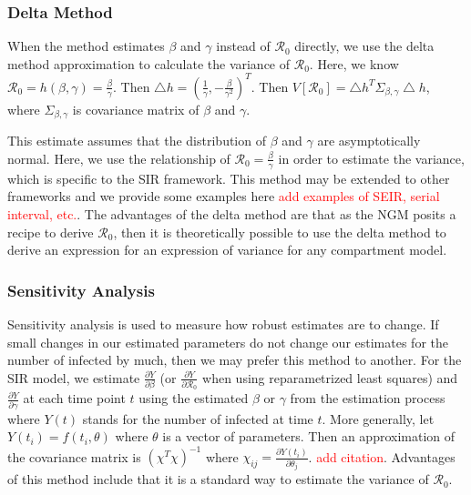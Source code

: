 \documentclass[12pt]{article}
\newcommand{\com}[1]{\textcolor{red}{ #1}}
\newcommand{\rr}{\ensuremath{\mathcal{R}_0}}
\begin{document}
\subsubsection{Delta Method}\label{delta-method}

When the method estimates \(\beta\) and \(\gamma\) instead of \(\rr\) directly, we use the delta method approximation to calculate the
variance of \(\rr\). Here, we know \(\rr = h(\beta, \gamma) = \frac{\beta}{\gamma}\). Then \(\bigtriangleup h = (\frac{1}{\gamma},  -\frac{\beta}{\gamma^2})^T\).  Then \(V[\rr] = \bigtriangleup h^T \Sigma_{\beta, \gamma} \bigtriangleup h\), where \(\Sigma_{\beta, \gamma}\) is covariance matrix of \(\beta\) and \(\gamma\).

This estimate assumes that the distribution of $\beta$ and $\gamma$ are asymptotically normal.  Here, we use the relationship of $\rr = \frac{\beta}{\gamma}$ in order to estimate the variance, which is specific to the SIR framework.  This method may be extended to other frameworks and we provide some examples here \com{add examples of SEIR, serial interval, etc.}.  The advantages of the delta method are that as the NGM posits a recipe to derive $\rr$, then it is theoretically possible to use the delta method to derive an expression for an expression of variance for any compartment model.

\subsubsection{Sensitivity Analysis}\label{sensitivity-analysis}

Sensitivity analysis is used to measure how robust estimates are to change.  If small changes in our estimated parameters do not change our estimates for the number of infected by much, then we may prefer this method to another.  For the SIR model, we estimate \(\frac{\partial Y}{\partial \beta}\) (or \(\frac{\partial Y}{\partial \rr}\) when using reparametrized least squares) and \(\frac{\partial Y}{\partial \gamma}\) at each time point \(t\) using the estimated \(\beta\) or \(\gamma\) from the estimation process where $Y(t)$ stands for the number of infected at time $t$.  More generally,  let $Y(t_i) = f(t_i, \theta)$ where $\theta$ is a vector of parameters. Then an approximation of the covariance matrix is \((\chi^T \chi)^{-1}\) where \(\chi_{ij} = \frac{ \partial Y(t_i)}{ \partial \theta_j}\). \com{add citation}.  Advantages of this method include that it is a standard way to estimate the variance of $\rr$.
\end{document}
